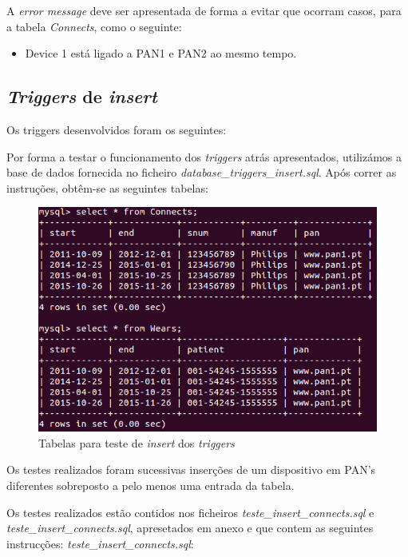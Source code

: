 \documentclass[a4paper]{article}
\begin{document}
A \textit{error message} deve ser apresentada de forma a evitar que ocorram casos,  para a tabela \textit{Connects}, como o seguinte: 

\begin{itemize}

\item Device 1 está ligado a PAN1 e PAN2 ao mesmo tempo.

\end{itemize}
\pagebreak
\subsection{\textit{Triggers} de \textit{insert}}

Os triggers desenvolvidos foram os seguintes:



Por forma a testar o funcionamento dos \textit{triggers} atrás apresentados, utilizámos a base de dados fornecida no ficheiro \textit{database\_triggers\_insert.sql}. Após correr as instruções, obtêm-se as seguintes tabelas:
\begin{figure}[ht!]
\centering
\includegraphics[scale=0.7]{tabelas_insert_triggers.png}
\caption{Tabelas para teste de \textit{insert} dos \textit{triggers}}
\end{figure}

Os testes realizados foram sucessivas inserções de um dispositivo em PAN's diferentes sobreposto a pelo menos uma entrada da tabela.

Os testes realizados estão contidos nos ficheiros \textit{teste\_insert\_connects.sql} e \textit{teste\_insert\_connects.sql}, apresetados em anexo e que contem as seguintes instrucções:
\vskip 5mm
\textit{teste\_insert\_connects.sql}:

\end{document}
